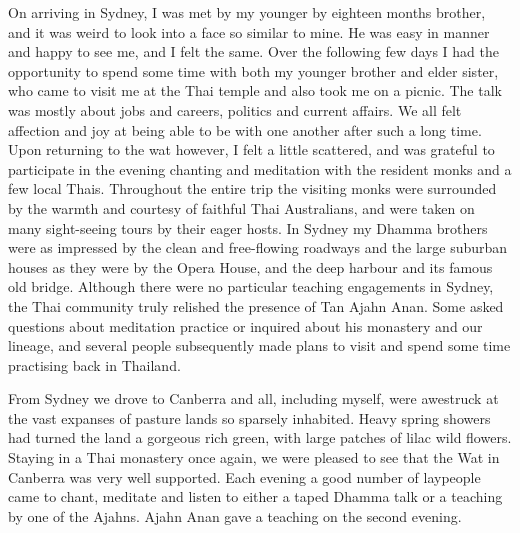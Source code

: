 On arriving in Sydney, I was met by my younger by eighteen months
brother, and it was weird to look into a face so similar to mine. He was
easy in manner and happy to see me, and I felt the same. Over the
following few days I had the opportunity to spend some time with both my
younger brother and elder sister, who came to visit me at the Thai
temple and also took me on a picnic. The talk was mostly about jobs and
careers, politics and current affairs. We all felt affection and joy at
being able to be with one another after such a long time. Upon returning
to the wat however, I felt a little scattered, and was grateful to
participate in the evening chanting and meditation with the resident
monks and a few local Thais. Throughout the entire trip the visiting
monks were surrounded by the warmth and courtesy of faithful Thai
Australians, and were taken on many sight-seeing tours by their eager
hosts. In Sydney my Dhamma brothers were as impressed by the clean and
free-flowing roadways and the large suburban houses as they were by the
Opera House, and the deep harbour and its famous old bridge. Although
there were no particular teaching engagements in Sydney, the Thai
community truly relished the presence of Tan Ajahn Anan. Some asked
questions about meditation practice or inquired about his monastery and
our lineage, and several people subsequently made plans to visit and
spend some time practising back in Thailand. 

From Sydney we drove to Canberra and all, including myself, were
awestruck at the vast expanses of pasture lands so sparsely inhabited. 
Heavy spring showers had turned the land a gorgeous rich green, with
large patches of lilac wild flowers. Staying in a Thai monastery once
again, we were pleased to see that the Wat in Canberra was very well
supported. Each evening a good number of laypeople came to chant, 
meditate and listen to either a taped Dhamma talk or a teaching by one
of the Ajahns. Ajahn Anan gave a teaching on the second evening. 


